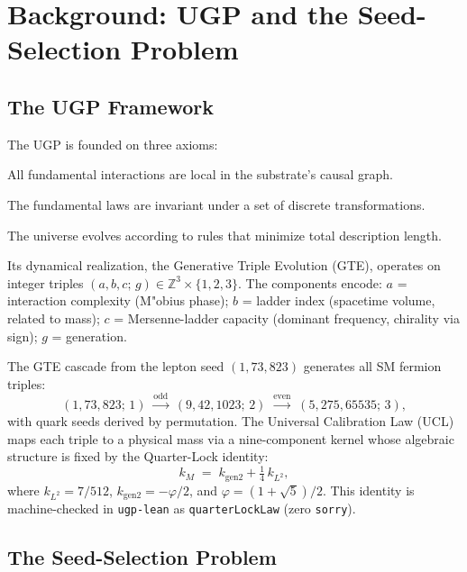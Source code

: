 \documentclass[11pt]{article}
\theoremstyle{remark}
\newcommand{\PHI}{\varphi}
\begin{document}
\section{Background: UGP and the Seed-Selection Problem}
\label{sec:ugp}

\subsection{The UGP Framework}

The UGP is founded on three axioms:
\begin{description}[leftmargin=1.5em]
  \item[A1 (Locality):] All fundamental interactions are local in the substrate's causal graph.
  \item[A2 (Symmetry):] The fundamental laws are invariant under a set of discrete transformations.
  \item[A3 (Compression/MDL):] The universe evolves according to rules that minimize total description length.
\end{description}

Its dynamical realization, the Generative Triple Evolution (GTE), operates on integer
triples $(a, b, c;\, g) \in \mathbb{Z}^3 \times \{1,2,3\}$.
The components encode: $a$ = interaction complexity (M"obius phase); $b$ = ladder index
(spacetime volume, related to mass); $c$ = Mersenne-ladder capacity (dominant frequency,
chirality via sign); $g$ = generation.

The GTE cascade from the lepton seed $(1, 73, 823)$ generates all SM fermion triples:
\[
  (1, 73, 823;\,1) \;\xrightarrow{\text{odd}}\;
  (9, 42, 1023;\,2) \;\xrightarrow{\text{even}}\;
  (5, 275, 65535;\,3),
\]
with quark seeds derived by permutation.
The Universal Calibration Law (UCL) maps each triple to a physical mass via a
nine-component kernel whose algebraic structure is fixed by the Quarter-Lock identity:
\begin{equation}
  k_M \;=\; k_{\mathrm{gen2}} + \tfrac{1}{4}\,k_{L^2},
  \label{eq:quarterlock}
\end{equation}
where $k_{L^2} = 7/512$, $k_{\mathrm{gen2}} = -\PHI/2$, and
$\PHI = (1+\sqrt{5})/2$.
This identity is machine-checked in \texttt{ugp-lean} as
\texttt{quarter\-Lock\-Law} (zero \texttt{sorry}).

\subsection{The Seed-Selection Problem}
\end{document}
